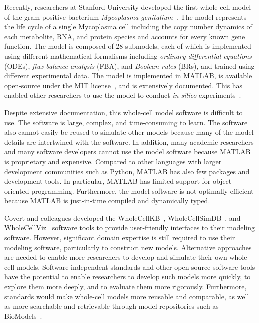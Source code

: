 \documentclass[journal,transmag]{IEEEtran}
\begin{document}
Recently, researchers at Stanford University developed the first whole-cell model of the gram-positive bacterium \textit{Mycoplasma genitalium}~\cite{Karr2012}. The model represents the life cycle of a single Mycoplasma cell including the copy number dynamics of each metabolite, RNA, and protein species and accounts for every known gene function. The model is composed of 28 submodels, each of which is implemented using different mathematical formalisms including \emph{ordinary differential equations} (ODEs), \emph{flux balance analysis} (FBA), and \emph{Boolean rules} (BRs), and trained using different experimental data. 
The model is implemented in MATLAB, is available open-source under the MIT license~\cite{wholeCell}, and is extensively documented. This has enabled other researchers to use the model to conduct \textit{in silico} experiments~\cite{Sanghvi2013, Purcell2013, Kazakiewicz2015}. 

Despite extensive documentation, this whole-cell model software is difficult to use. The software is large, complex, and time-consuming to learn. The software also cannot easily be reused to simulate other models because many of the model details are intertwined with the software. In addition, many academic researchers and many software developers cannot use the model software because MATLAB is proprietary and expensive. Compared to other languages with larger development communities such as Python, MATLAB has also few packages and development tools. In particular, MATLAB has limited support for object-oriented programming. Furthermore, the model software is not optimally efficient because MATLAB is just-in-time compiled and dynamically typed.

Covert and colleagues developed the WholeCellKB~\cite{Karr2013}, WholeCellSimDB~\cite{Karr2014}, and WholeCellViz~\cite{Lee2013} software tools to provide user-friendly interfaces to their modeling software. However, significant domain expertise is still required to use their modeling software, particularly to construct new models. Alternative approaches are needed to enable more researchers to develop and simulate their own whole-cell models. Software-independent standards and other open-source software tools have the potential to enable researchers to develop such models more quickly, to explore them more deeply, and to evaluate them more rigorously. Furthermore, standards would make whole-cell models more reusable and comparable, as well as more searchable and retrievable through model repositories such as BioModels~\cite{juty2015biomodels,chelliah2015biomodels}.
\end{document}
